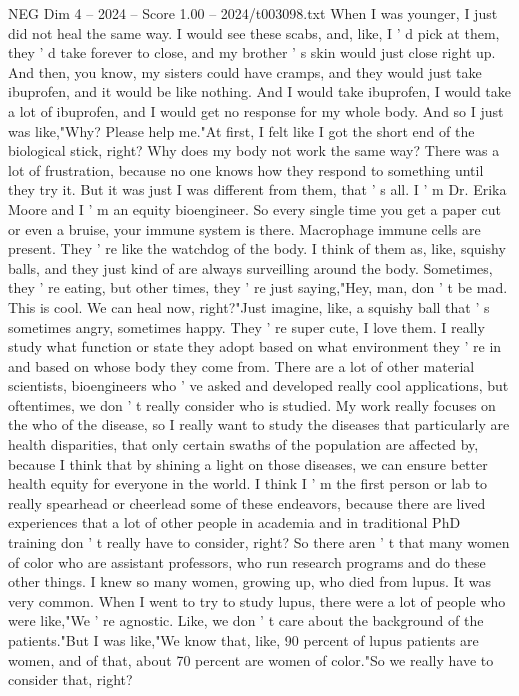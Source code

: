 \begin{textsample}{NEG Dim 4 – 2024 – Score 1.00 – 2024/t003098.txt}  \label{ex:f4_neg_074}
When I was younger, I just did not heal the same way.
I would see these scabs, and, like, I ' d pick at them, they ' d take forever to close, and my brother ' s skin would just close right up.
And then, you know, my sisters could have cramps, and they would just take ibuprofen, and it would be like nothing.
And I would take ibuprofen, I would take a lot of ibuprofen, and I would get no response for my whole body.
And so I just was like,"Why?
Please help me."At first, I felt like I got the short end of the biological stick, right?
Why does my body not work the same way?
There was a lot of frustration, because no one knows how they respond to something until they try it.
But it was just I was different from them, that ' s all.
I ' m Dr.
Erika Moore and I ' m an equity bioengineer.
So every single time you get a paper cut or even a bruise, your immune system is there.
Macrophage immune cells are present.
They ' re like the watchdog of the body.
I think of them as, like, squishy balls, and they just kind of are always surveilling around the body.
Sometimes, they ' re eating, but other times, they ' re just saying,"Hey, man, don ' t be mad.
This is cool.
We can heal now, right?"Just imagine, like, a squishy ball that ' s sometimes angry, sometimes happy.
They ' re super cute, I love them.
I really study what function or state they adopt based on what environment they ' re in and based on whose body they come from.
There are a lot of other material scientists, bioengineers who ' ve asked and developed really cool applications, but oftentimes, we don ' t really consider who is studied.
My work really focuses on the who of the disease, so I really want to study the diseases that particularly are health disparities, that only certain swaths of the population are affected by, because I think that by shining a light on those diseases, we can ensure better health equity for everyone in the world.
I think I ' m the first person or lab to really spearhead or cheerlead some of these endeavors, because there are lived experiences that a lot of other people in academia and in traditional PhD training don ' t really have to consider, right?
So there aren ' t that many women of color who are assistant professors, who run research programs and do these other things.
I knew so many women, growing up, who died from lupus.
It was very common.
When I went to try to study lupus, there were a lot of people who were like,"We ' re agnostic.
Like, we don ' t care about the background of the patients."But I was like,"We know that, like, 90 percent of lupus patients are women, and of that, about 70 percent are women of color."So we really have to consider that, right?

\end{textsample}
